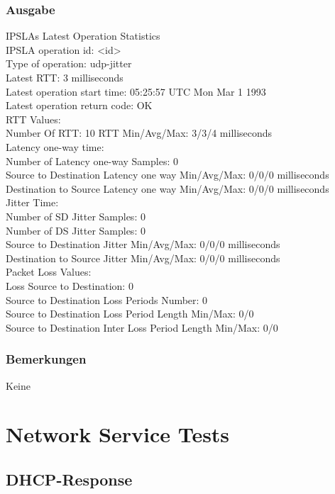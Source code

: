 \documentclass[a4,12pt]{scrartcl}
\begin{document}
\subsubsection{Ausgabe}
IPSLAs Latest Operation Statistics\\

\noindent IPSLA operation id: <id>\\
Type of operation: udp-jitter\\
        Latest RTT: 3 milliseconds\\
Latest operation start time: 05:25:57 UTC Mon Mar 1 1993\\
Latest operation return code: OK\\
RTT Values:\\
        Number Of RTT: 10               RTT Min/Avg/Max: 3/3/4 milliseconds\\
Latency one-way time:\\
        Number of Latency one-way Samples: 0\\
        Source to Destination Latency one way Min/Avg/Max: 0/0/0 milliseconds\\
        Destination to Source Latency one way Min/Avg/Max: 0/0/0 milliseconds\\
Jitter Time:\\
        Number of SD Jitter Samples: 0\\
        Number of DS Jitter Samples: 0\\
        Source to Destination Jitter Min/Avg/Max: 0/0/0 milliseconds\\
        Destination to Source Jitter Min/Avg/Max: 0/0/0 milliseconds\\
Packet Loss Values:\\
        Loss Source to Destination: 0\\
        Source to Destination Loss Periods Number: 0\\
        Source to Destination Loss Period Length Min/Max: 0/0\\
        Source to Destination Inter Loss Period Length Min/Max: 0/0\\
\subsubsection{Bemerkungen}
Keine

\newpage
\section{Network Service Tests}
\subsection{DHCP-Response}
\end{document}
